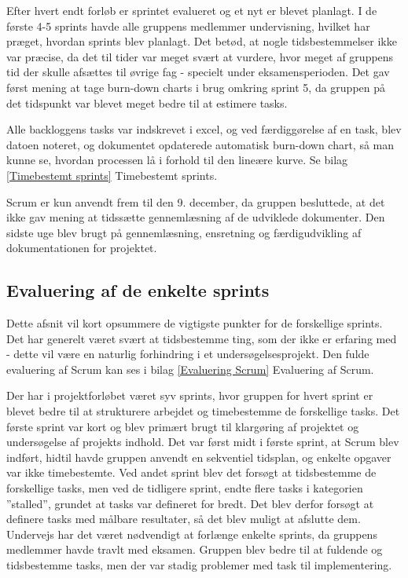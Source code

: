 Efter hvert endt forløb er sprintet evalueret og et nyt er blevet planlagt. I de første 4-5 sprints havde alle gruppens medlemmer undervisning, hvilket har præget, hvordan sprints blev planlagt. Det betød, at nogle tidsbestemmelser ikke var præcise, da det til tider var meget svært at vurdere, hvor meget af gruppens tid der skulle afsættes til øvrige fag - specielt under eksamensperioden. Det gav først mening at tage burn-down charts i brug omkring sprint 5, da gruppen på det tidspunkt var blevet meget bedre til at estimere tasks.

Alle backloggens tasks var indskrevet i excel, og ved færdiggørelse af en task, blev datoen noteret, og dokumentet opdaterede automatisk burn-down chart, så man kunne se, hvordan processen lå i forhold til den lineære kurve. Se bilag \ref{Timebestemt sprints} Timebestemt sprints. 

Scrum er kun anvendt frem til den 9. december, da gruppen besluttede, at det ikke gav mening at tidssætte gennemlæsning af de udviklede dokumenter. Den sidste uge blev brugt på gennemlæsning, ensretning og færdigudvikling af dokumentationen for projektet.  

\subsection{Evaluering af de enkelte sprints} 
Dette afsnit vil kort opsummere de vigtigste punkter for de forskellige sprints. Det har generelt været svært at tidsbestemme ting, som der ikke er erfaring med - dette vil være en naturlig forhindring i et undersøgelsesprojekt. Den fulde evaluering af Scrum kan ses i bilag \ref{Evaluering Scrum} Evaluering af Scrum.

Der har i projektforløbet været syv sprints, hvor gruppen for hvert sprint er blevet bedre til at strukturere arbejdet og timebestemme de forskellige tasks. Det første sprint var kort og blev primært brugt til klargøring af projektet og undersøgelse af projekts indhold. Det var først midt i første sprint, at Scrum blev indført, hidtil havde gruppen anvendt en sekventiel tidsplan, og enkelte opgaver var ikke timebestemte. Ved andet sprint blev det forsøgt at tidsbestemme de forskellige tasks, men ved de tidligere sprint, endte flere tasks i kategorien ”stalled”, grundet at tasks var defineret for bredt. Det blev derfor forsøgt at definere tasks med målbare resultater, så det blev muligt at afslutte dem. Undervejs har det været nødvendigt at forlænge enkelte sprints, da gruppens medlemmer havde travlt med eksamen. Gruppen blev bedre til at fuldende og tidsbestemme tasks, men der var stadig problemer med task til implementering. 

